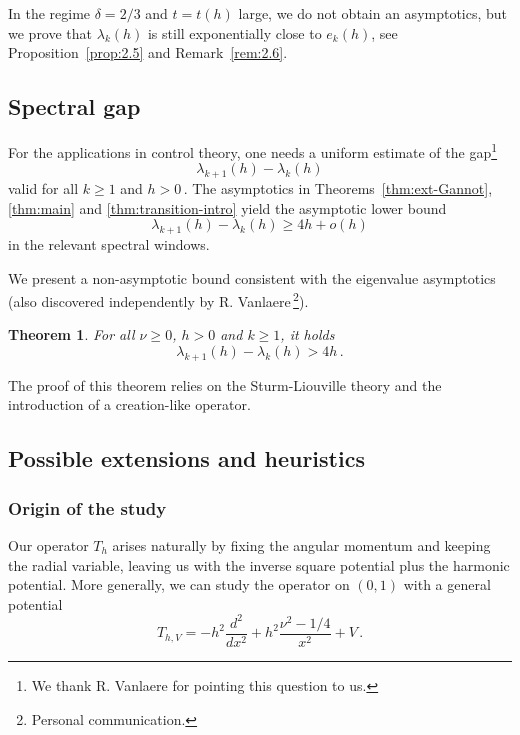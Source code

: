 \documentclass[11pt]{amsart}
\numberwithin{equation}{section}
\newtheorem{theorem}{Theorem}[section]
\theoremstyle{remark}
\begin{document}
In the regime $\delta=2/3$ and $t=t(h)$ large, we do not obtain an asymptotics, but we prove that $\lambda_k(h)$ is still exponentially close to $e_k(h)$, see Proposition~\ref{prop:2.5} and Remark~\ref{rem:2.6}.

\subsection{Spectral gap}  For the applications in control theory, one needs 
a uniform estimate of the gap\footnote{We thank R. Vanlaere for pointing this question to us.}
\[\lambda_{k+1}(h)-\lambda_k(h)\]
valid for all $k\geq 1$ and $h>0\,$. The asymptotics in Theorems~\ref{thm:ext-Gannot}, \ref{thm:main} and \ref{thm:transition-intro} yield the asymptotic lower bound
\[\lambda_{k+1}(h)-\lambda_k(h)\geq 4h+o(h)\]
in the relevant spectral windows. 

We  present a non-asymptotic bound  consistent with the eigenvalue asymptotics (also discovered independently by R. Vanlaere\,\footnote{Personal communication.}).
%
\begin{theorem}\label{thm:gap}
For all $\nu\geq 0$, $h>0$ and $k\geq 1$, it holds
\begin{equation}\label{eq:gap}
\lambda_{k+1}(h)-\lambda_k(h)>4h\, .
\end{equation}
\end{theorem}

The proof of this theorem relies on the Sturm-Liouville theory and the introduction of a creation-like operator.


\subsection{Possible extensions and heuristics}
%
%
\subsubsection{Origin of the study}
Our operator $T_h$ arises  naturally by fixing the angular momentum and keeping the radial variable, leaving us with the inverse square potential plus the harmonic potential. More generally, we can study the operator on $(0,1)$ with a general potential
\begin{equation}\label{eq:generic-operator}
T_{h,V}=-h^2 \frac{d^2}{dx^2}+h^2\frac{\nu^2-1/4}{x^2}+V\,.
\end{equation}
\end{document}
